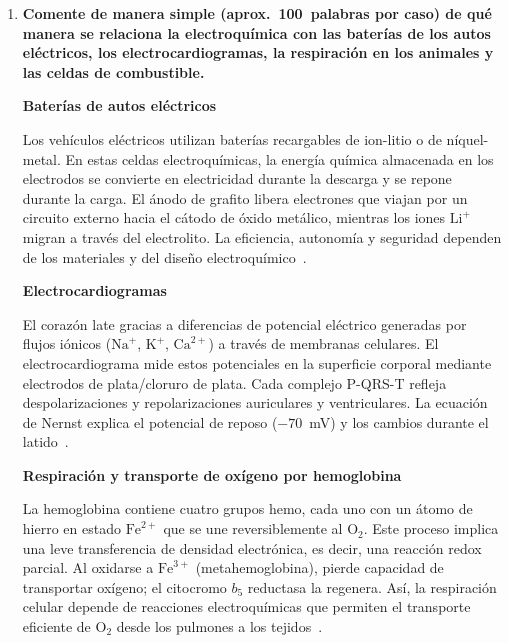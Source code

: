 \documentclass[12pt]{article}
\begin{document}
\begin{enumerate}[label=\textbf{\alph*)}, leftmargin=1.2cm]
    La teoría predice que las Celdas~1 y 2 deben tener el mismo voltaje
    (1.100~V, pues $Q = 1$), que la Celda~3 sea ligeramente menor que la~1 y
    que la Celda~4 sea ligeramente mayor. Experimentalmente se observa la
    tendencia cualitativa correcta, aunque el valor absoluto se aleja del
    teórico. Los resultados no son correctos en términos absolutos, pero sí
    validan cualitativamente la ecuación de Nernst al mostrar la dependencia
    del voltaje con la concentración.

    \item \textbf{Comente de manera simple (aprox.\ 100~palabras por caso) de
          qué manera se relaciona la electroquímica con las baterías de los
          autos eléctricos, los electrocardiogramas, la respiración en los
          animales y las celdas de combustible.}

    \noindent\textbf{Baterías de autos eléctricos}

    Los vehículos eléctricos utilizan baterías recargables de ion-litio o de
    níquel-metal. En estas celdas electroquímicas, la energía química
    almacenada en los electrodos se convierte en electricidad durante la
    descarga y se repone durante la carga. El ánodo de grafito libera
    electrones que viajan por un circuito externo hacia el cátodo de óxido
    metálico, mientras los iones $\text{Li}^+$ migran a través del
    electrolito. La eficiencia, autonomía y seguridad dependen de los
    materiales y del diseño electroquímico~\cite{rodriguez,stanford}.

    \vspace{0.4cm}
    \noindent\textbf{Electrocardiogramas}

    El corazón late gracias a diferencias de potencial eléctrico generadas por
    flujos iónicos ($\text{Na}^+$, $\text{K}^+$, $\text{Ca}^{2+}$) a través
    de membranas celulares. El electrocardiograma mide estos potenciales en la
    superficie corporal mediante electrodos de plata/cloruro de plata. Cada
    complejo P-QRS-T refleja despolarizaciones y repolarizaciones auriculares y
    ventriculares. La ecuación de Nernst explica el potencial de reposo
    ($-70$~mV) y los cambios durante el latido~\cite{khan,unam}.

    \vspace{0.4cm}
    \noindent\textbf{Respiración y transporte de oxígeno por hemoglobina}

    La hemoglobina contiene cuatro grupos hemo, cada uno con un átomo de
    hierro en estado $\text{Fe}^{2+}$ que se une reversiblemente al
    $\text{O}_2$. Este proceso implica una leve transferencia de densidad
    electrónica, es decir, una reacción redox parcial. Al oxidarse a
    $\text{Fe}^{3+}$ (metahemoglobina), pierde capacidad de transportar
    oxígeno; el citocromo $b_5$ reductasa la regenera. Así, la respiración
    celular depende de reacciones electroquímicas que permiten el transporte
    eficiente de $\text{O}_2$ desde los pulmones a los
    tejidos~\cite{sepulveda2020}.


\end{enumerate}
\end{document}
